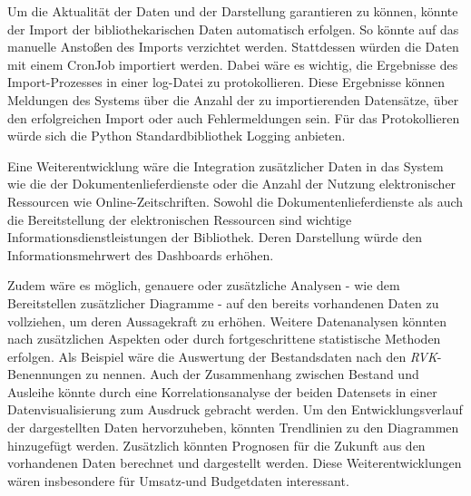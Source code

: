 Um die Aktualität der Daten und der Darstellung garantieren zu können, könnte der Import der bibliothekarischen Daten automatisch erfolgen. So könnte auf das manuelle
Anstoßen des Imports verzichtet werden. Stattdessen würden die Daten mit einem CronJob importiert werden. Dabei wäre es wichtig, die Ergebnisse des Import-Prozesses in einer log-Datei zu protokollieren. 
Diese Ergebnisse können Meldungen des Systems über die Anzahl der zu importierenden Datensätze, über den erfolgreichen Import oder auch Fehlermeldungen sein.
Für das Protokollieren würde sich die Python Standardbibliothek Logging anbieten.

Eine Weiterentwicklung wäre die Integration zusätzlicher Daten in das System wie die der Dokumentenlieferdienste oder die Anzahl der Nutzung elektronischer Ressourcen wie Online-Zeitschriften. 
Sowohl die Dokumentenlieferdienste als auch die Bereitstellung der elektronischen Ressourcen sind wichtige Informationsdienstleistungen der Bibliothek. 
Deren Darstellung würde den Informationsmehrwert des Dashboards erhöhen.


Zudem wäre es möglich, genauere oder zusätzliche Analysen - wie dem Bereitstellen zusätzlicher Diagramme - auf den bereits vorhandenen Daten zu vollziehen, um deren Aussagekraft zu erhöhen.
Weitere Datenanalysen könnten nach zusätzlichen Aspekten oder durch fortgeschrittene statistische Methoden erfolgen. Als Beispiel wäre die Auswertung der Bestandsdaten nach den \textit{\acrshort{RVK}}-Benennungen
zu nennen. Auch der Zusammenhang zwischen Bestand und Ausleihe könnte durch eine Korrelationsanalyse der beiden Datensets in einer Datenvisualisierung zum Ausdruck gebracht werden.
Um den Entwicklungsverlauf der dargestellten Daten hervorzuheben, könnten Trendlinien zu den Diagrammen hinzugefügt werden. Zusätzlich könnten Prognosen
für die Zukunft aus den vorhandenen Daten berechnet und dargestellt werden. Diese Weiterentwicklungen wären insbesondere für Umsatz-und Budgetdaten interessant.




